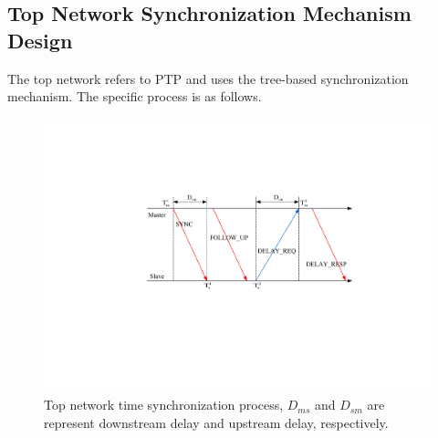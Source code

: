 \documentclass[conference]{IEEEtran}
\begin{document}




\subsection{Top Network Synchronization Mechanism Design}\label{AA} 

The top network refers to PTP and uses the tree-based synchronization mechanism. The specific process is as follows.

\begin{figure}[htbp]
	\centerline{\includegraphics[scale=0.5]{fig2.eps}}
	\caption{Top network time synchronization process, $D_{ms}$ and $D_{sm}$ are represent downstream delay and upstream delay, respectively.}
	\label{fig2}
\end{figure}
\end{document}
